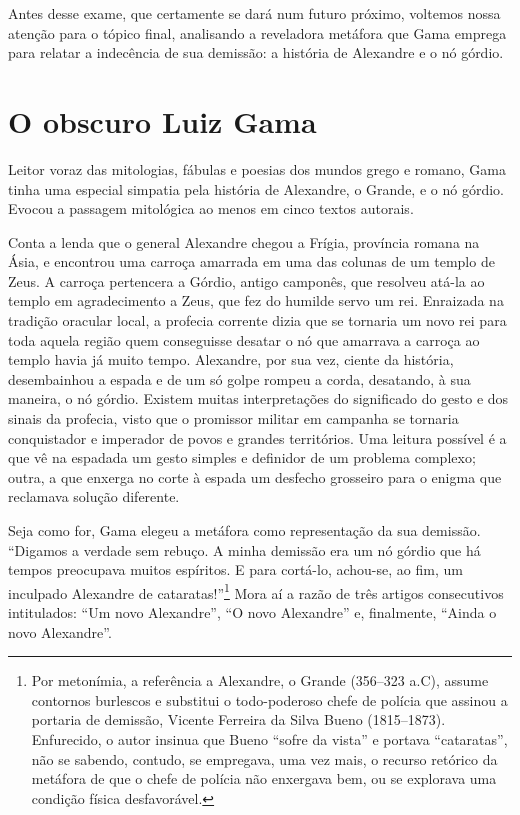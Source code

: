 Antes desse exame, que certamente se dará num futuro próximo, voltemos
nossa atenção para o tópico final, analisando a reveladora metáfora que
Gama emprega para relatar a indecência de sua demissão: a história de
Alexandre e o nó górdio.

\section{O obscuro Luiz Gama}

Leitor voraz das mitologias, fábulas e poesias dos mundos grego e
romano, Gama tinha uma especial simpatia pela história de Alexandre, o
Grande, e o nó górdio. Evocou a passagem mitológica ao menos em cinco
textos autorais.

Conta a lenda que o general Alexandre chegou a Frígia, província romana
na Ásia, e encontrou uma carroça amarrada em uma das colunas de um
templo de Zeus. A carroça pertencera a Górdio, antigo camponês, que
resolveu atá-la ao templo em agradecimento a Zeus, que fez do humilde
servo um rei. Enraizada na tradição oracular local, a profecia corrente
dizia que se tornaria um novo rei para toda aquela região quem
conseguisse desatar o nó que amarrava a carroça ao templo havia já muito
tempo. Alexandre, por sua vez, ciente da história, desembainhou a espada
e de um só golpe rompeu a corda, desatando, à sua maneira, o nó górdio.
Existem muitas interpretações do significado do gesto e dos sinais da
profecia, visto que o promissor militar em campanha se tornaria
conquistador e imperador de povos e grandes territórios. Uma leitura
possível é a que vê na espadada um gesto simples e definidor de um
problema complexo; outra, a que enxerga no corte à espada um desfecho
grosseiro para o enigma que reclamava solução diferente.

Seja como for, Gama elegeu a metáfora como representação da sua
demissão. ``Digamos a verdade sem rebuço. A minha demissão era um nó
górdio que há tempos preocupava muitos espíritos. E para cortá-lo,
achou-se, ao fim, um inculpado Alexandre de cataratas!''\footnote{Por
  metonímia, a referência a Alexandre, o Grande (356--323 a.C), assume
  contornos burlescos e substitui o todo-poderoso chefe de polícia que
  assinou a portaria de demissão, Vicente Ferreira da Silva Bueno
  (1815--1873). Enfurecido, o autor insinua que Bueno ``sofre da vista'' e
  portava ``cataratas'', não se sabendo, contudo, se empregava, uma vez
  mais, o recurso retórico da metáfora de que o chefe de polícia não
  enxergava bem, ou se explorava uma condição física desfavorável.}
Mora aí a razão de três artigos consecutivos intitulados:
``Um novo Alexandre'', ``O novo Alexandre'' e,
finalmente, ``Ainda o novo Alexandre''.

